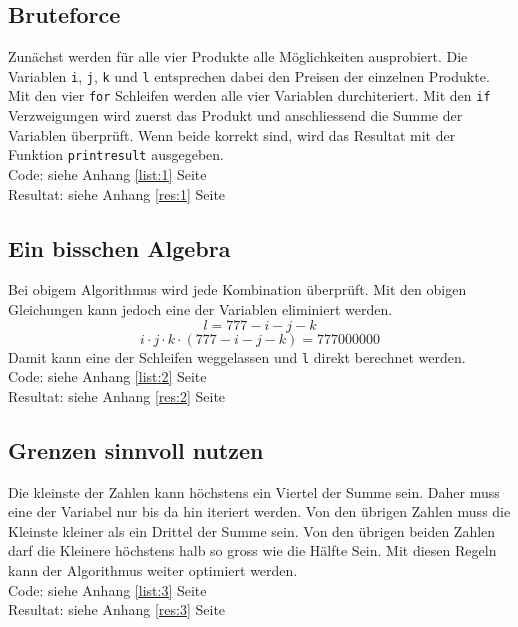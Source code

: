\documentclass[a4paper, 10pt, fleqn]{article}
\begin{document}
\subsection{Bruteforce}
\label{sec:1}
Zunächst werden für alle vier Produkte alle Möglichkeiten ausprobiert. Die 
Variablen \verb!i!, \verb!j!, \verb!k! und \verb!l! entsprechen dabei den 
Preisen der einzelnen Produkte. \\
Mit den vier \verb!for! Schleifen werden alle vier Variablen durchiteriert. 
Mit den \verb!if! Verzweigungen wird zuerst das Produkt und anschliessend die 
Summe der Variablen überprüft. Wenn beide korrekt sind, wird das Resultat 
mit der Funktion \verb!printresult! ausgegeben. \\
Code: siehe Anhang \ref{list:1} Seite \pageref{list:1} \\
Resultat: siehe Anhang \ref{res:1} Seite \pageref{res:1} 
% 

\subsection{Ein bisschen Algebra}
\label{sec:2}
Bei obigem Algorithmus wird jede Kombination überprüft. Mit den obigen 
Gleichungen kann jedoch eine der Variablen eliminiert werden. 
\[ l = 777 - i - j - k \]
\[ i \cdot j \cdot k \cdot (777 - i - j - k) = 777000000 \]
Damit kann eine der Schleifen weggelassen und \verb!l! direkt berechnet werden. \\
Code: siehe Anhang \ref{list:2} Seite \pageref{list:2} \\
Resultat: siehe Anhang \ref{res:2} Seite \pageref{res:2} 
% 

\subsection{Grenzen sinnvoll nutzen}
\label{sec:3}
Die kleinste der Zahlen kann höchstens ein Viertel der Summe sein. Daher muss 
eine der Variabel nur bis da hin iteriert werden. Von den übrigen Zahlen muss 
die Kleinste kleiner als ein Drittel der Summe sein. Von den übrigen beiden 
Zahlen darf die Kleinere höchstens halb so gross wie die Hälfte Sein. Mit 
diesen Regeln kann der Algorithmus weiter optimiert werden. \\
Code: siehe Anhang \ref{list:3} Seite \pageref{list:3} \\
Resultat: siehe Anhang \ref{res:3} Seite \pageref{res:3} 
% 
\end{document}
